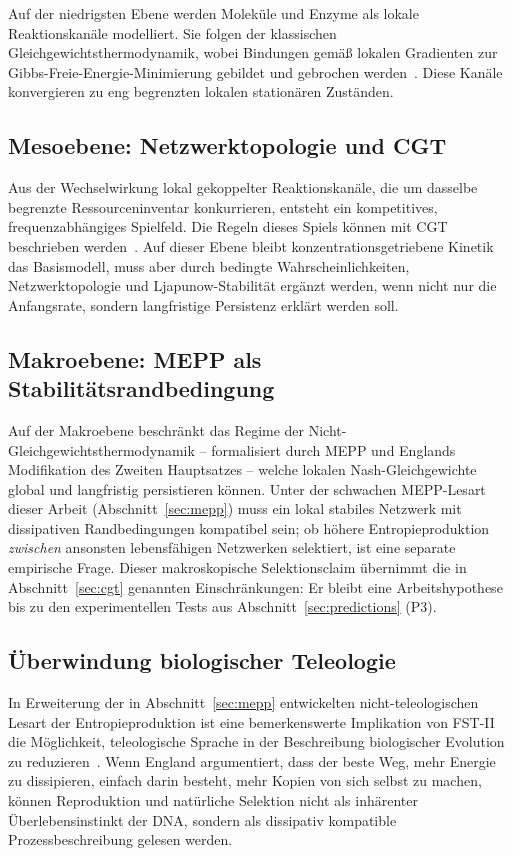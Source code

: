 \documentclass[12pt,a4paper]{article}
\theoremstyle{remark}
\begin{document}
Auf der niedrigsten Ebene werden Moleküle und Enzyme als lokale Reaktionskanäle modelliert. Sie folgen der klassischen Gleichgewichtsthermodynamik, wobei Bindungen gemäß lokalen Gradienten zur Gibbs-Freie-Energie-Minimierung gebildet und gebrochen werden~\citep{MetabolicNash}. Diese Kanäle konvergieren zu eng begrenzten lokalen stationären Zuständen.

\subsection{Mesoebene: Netzwerktopologie und CGT}

Aus der Wechselwirkung lokal gekoppelter Reaktionskanäle, die um dasselbe begrenzte Ressourceninventar konkurrieren, entsteht ein kompetitives, frequenzabhängiges Spielfeld. Die Regeln dieses Spiels können mit CGT beschrieben werden~\citep{AzoarcusPNAS}. Auf dieser Ebene bleibt konzentrationsgetriebene Kinetik das Basismodell, muss aber durch bedingte Wahrscheinlichkeiten, Netzwerktopologie und Ljapunow-Stabilität ergänzt werden, wenn nicht nur die Anfangsrate, sondern langfristige Persistenz erklärt werden soll.

\subsection{Makroebene: MEPP als Stabilitätsrandbedingung}

Auf der Makroebene beschränkt das Regime der Nicht-Gleichgewichtsthermodynamik -- formalisiert durch MEPP und Englands Modifikation des Zweiten Hauptsatzes -- welche lokalen Nash-Gleichgewichte global und langfristig persistieren können. Unter der schwachen MEPP-Lesart dieser Arbeit (Abschnitt~\ref{sec:mepp}) muss ein lokal stabiles Netzwerk mit dissipativen Randbedingungen kompatibel sein; ob höhere Entropieproduktion \emph{zwischen} ansonsten lebensfähigen Netzwerken selektiert, ist eine separate empirische Frage. Dieser makroskopische Selektionsclaim übernimmt die in Abschnitt~\ref{sec:cgt} genannten Einschränkungen: Er bleibt eine Arbeitshypothese bis zu den experimentellen Tests aus Abschnitt~\ref{sec:predictions} (P3).

\subsection{Überwindung biologischer Teleologie}

In Erweiterung der in Abschnitt~\ref{sec:mepp} entwickelten nicht-teleologischen Lesart der Entropieproduktion ist eine bemerkenswerte Implikation von FST-II die Möglichkeit, teleologische Sprache in der Beschreibung biologischer Evolution zu reduzieren~\citep{UnbecomingBeing}. Wenn England argumentiert, dass \glqq der beste Weg, mehr Energie zu dissipieren, einfach darin besteht, mehr Kopien von sich selbst zu machen\grqq{}, können Reproduktion und \glqq natürliche Selektion\grqq{} nicht als inhärenter Überlebensinstinkt der DNA, sondern als dissipativ kompatible Prozessbeschreibung gelesen werden.
\end{document}
